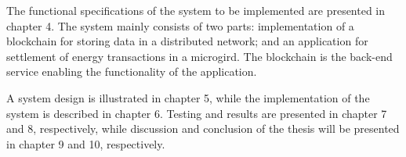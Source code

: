 The functional specifications of the system to be implemented are presented in chapter 4. The system mainly consists of two parts: implementation of a blockchain for storing data in a distributed network; and an application for settlement of energy transactions in a microgird. The blockchain is the back-end service enabling the functionality of the application.

A system design is illustrated in chapter 5, while the implementation of the system is described in chapter 6. Testing and results are presented in chapter 7 and 8, respectively, while discussion and conclusion of the thesis will be presented in chapter 9 and 10, respectively.






